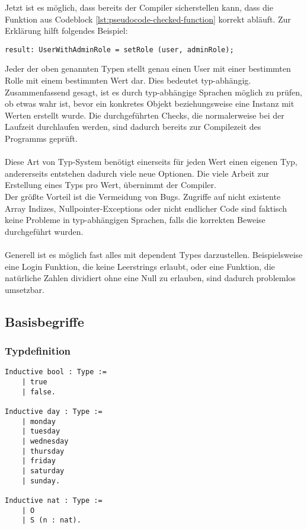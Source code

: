 Jetzt ist es möglich, dass bereits der Compiler sicherstellen kann, dass die Funktion aus Codeblock \ref{lst:pseudocode-checked-function} korrekt abläuft. Zur Erklärung hilft folgendes Beispiel:
\begin{lstlisting}[language=coq,firstnumber=1,caption=Pseudocode Check auf null des User Objektes,label=lst:pseudocode-checked-function-usage]
result: UserWithAdminRole = setRole (user, adminRole);
\end{lstlisting}
Jeder der oben genannten Typen stellt genau einen User mit einer bestimmten Rolle mit einem bestimmten Wert dar. Dies bedeutet typ-abhängig.\cite{MARTIN01:FV}
Zusammenfassend gesagt, ist es durch typ-abhängige Sprachen möglich zu prüfen, ob etwas wahr ist, bevor ein konkretes Objekt beziehungsweise eine Instanz mit Werten erstellt wurde. Die durchgeführten Checks, die normalerweise bei der Laufzeit durchlaufen werden, sind dadurch bereits zur Compilezeit des Programms geprüft.\\
\\
Diese Art von Typ-System benötigt einerseits für jeden Wert einen eigenen Typ, andererseits entstehen dadurch viele neue Optionen. Die viele Arbeit zur Erstellung eines Typs pro Wert, übernimmt der Compiler.\\
Der größte Vorteil ist die Vermeidung von Bugs. Zugriffe auf nicht existente Array Indizes, Nullpointer-Exceptions oder nicht endlicher Code sind faktisch keine Probleme in typ-abhängigen Sprachen, falls die korrekten Beweise durchgeführt wurden.\\
\\
Generell ist es möglich fast alles mit dependent Types darzustellen. Beispielsweise eine Login Funktion, die keine Leerstrings erlaubt, oder eine Funktion, die natürliche Zahlen dividiert ohne eine Null zu erlauben, sind dadurch problemlos umsetzbar.
\subsection{Basisbegriffe}
\subsubsection{Typdefinition}
\begin{lstlisting}[language=coq,firstnumber=1,caption=Coq Typedefinition,label=lst:typedefinition]
Inductive bool : Type :=
	| true
	| false.
	
Inductive day : Type :=
	| monday
	| tuesday
	| wednesday
	| thursday
	| friday
	| saturday
	| sunday.
	
Inductive nat : Type :=
	| O
	| S (n : nat).
\end{lstlisting}

